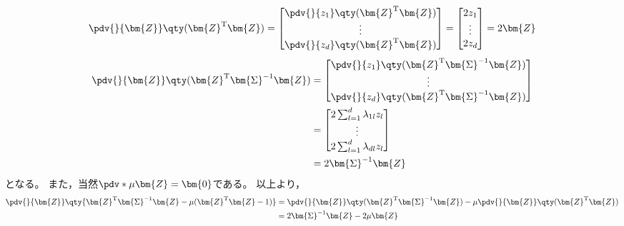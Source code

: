 \documentclass[class=jsarticle, crop=false, dvipdfmx, fleqn]{standalone}
\begin{document}
\begin{align}
    \pdv{}{\bm{Z}} \qty(\bm{Z}^\mathrm{T} \bm{Z})
        =
            \begin{bmatrix}
                \pdv{}{z_1} \qty(\bm{Z}^\mathrm{T} \bm{Z}) \\
                \vdots \\
                \pdv{}{z_d} \qty(\bm{Z}^\mathrm{T} \bm{Z}) \\
            \end{bmatrix}
        =
            \begin{bmatrix}
                2z_1 \\ \vdots \\ 2z_d
            \end{bmatrix}
        = 2 \bm{Z}
\end{align}
\begin{align}
    \pdv{}{\bm{Z}} \qty(\bm{Z}^\mathrm{T} \bm{\Sigma}^{-1} \bm{Z})
        & =
            \begin{bmatrix}
                \pdv{}{z_1} \qty(\bm{Z}^\mathrm{T} \bm{\Sigma}^{-1} \bm{Z}) \\
                \vdots \\
                \pdv{}{z_d} \qty(\bm{Z}^\mathrm{T} \bm{\Sigma}^{-1} \bm{Z}) \\
            \end{bmatrix} \\
        & =
            \begin{bmatrix}
                2\sum_{l=1}^{d} \lambda_{1l} z_l \\
                \vdots \\
                2\sum_{l=1}^{d} \lambda_{dl} z_l
            \end{bmatrix} \\
        & = 2 \bm{\Sigma}^{-1} \bm{Z}
\end{align}
となる。
また，当然\(\pdv*{\mu}{\bm{Z}} = \bm{0}\)である。
以上より，
\begin{align}
    \pdv{}{\bm{Z}} \qty{\bm{Z}^\mathrm{T} \bm{\Sigma}^{-1} \bm{Z} - \mu(\bm{Z}^\mathrm{T}\bm{Z} - 1)}
        & = \pdv{}{\bm{Z}} \qty(\bm{Z}^\mathrm{T} \bm{\Sigma}^{-1} \bm{Z}) - \mu \pdv{}{\bm{Z}} \qty(\bm{Z}^\mathrm{T} \bm{Z}) \\
        & = 2 \bm{\Sigma}^{-1} \bm{Z} - 2\mu\bm{Z}
\end{align}
\end{document}
